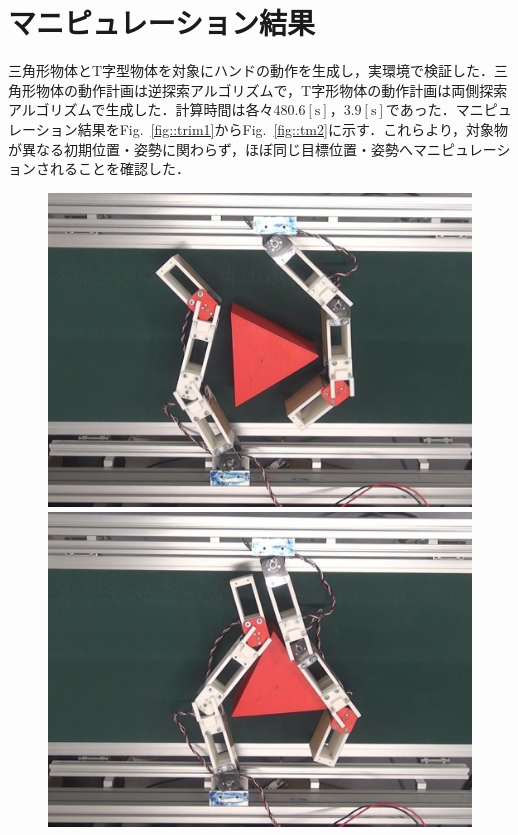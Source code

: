 \documentclass[a4paper,papersize,dvipdfmx]{mtabst}
\newcommand{\figref}[1]{Fig.~\ref{#1}}
\begin{document}
\section{マニピュレーション結果}
三角形物体とT字型物体を対象にハンドの動作を生成し，実環境で検証した．三角形物体の動作計画は逆探索アルゴリズムで，T字形物体の動作計画は両側探索アルゴリズムで生成した．計算時間は各々$480.6 \mathrm{[s]}$，$3.9 \mathrm{[s]}$であった．マニピュレーション結果を\figref{fig::trim1}から\figref{fig::tm2}に示す．これらより，対象物が異なる初期位置・姿勢に関わらず，ほぼ同じ目標位置・姿勢へマニピュレーションされることを確認した．
\begin{figure}[t]
\centering
\begin{minipage}{0.249\linewidth}
\centering
\includegraphics[width=0.9\linewidth]{fig/4-manipulation-result/Triangle/1-1.jpg}
\end{minipage}\hfill
\begin{minipage}{0.249\linewidth}
\centering
\includegraphics[width=0.9\linewidth]{fig/4-manipulation-result/Triangle/1-2.jpg}

\end{minipage}
\end{figure}
\end{document}
